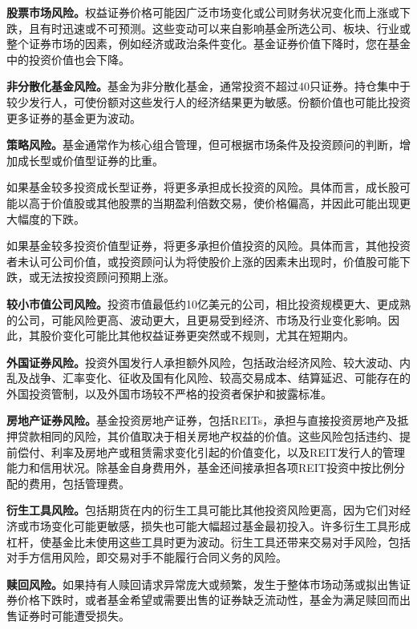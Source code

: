 \documentclass[UTF8,fontset=none,11pt,a4paper]{ctexart}
\begin{document}
\textbf{股票市场风险。}权益证券价格可能因广泛市场变化或公司财务状况变化而上涨或下跌，且有时迅速或不可预测。这些变动可以来自影响基金所选公司、板块、行业或整个证券市场的因素，例如经济或政治条件变化。基金证券价值下降时，您在基金中的投资价值\allowbreak\mbox{也会下降。}

\textbf{非分散化基金风险。}基金为非分散化基金，通常投资不超过40只证券。持仓集中于较少发行人，可使份额对这些发行人的经济结果更为敏感。份额价值也可能比投资更多证券的基金\allowbreak\mbox{更为波动。}

\textbf{策略风险。}基金通常作为核心组合管理，但可根据市场条件及投资顾问的判断，增加成长型或价值型证\allowbreak\mbox{券的比重。}

如果基金较多投资成长型证券，将更多承担成长投资的风险。具体而言，成长股可能以高于价值股或其他股票的当期盈利倍数交易，使价格偏高，并因此可能出现更大幅\allowbreak\mbox{度的下跌。}

如果基金较多投资价值型证券，将更多承担价值投资的风险。具体而言，其他投资者未认可公司价值，或投资顾问认为将使股价上涨的因素未出现时，价值股可能下跌，或无法按投资顾问\allowbreak\mbox{预期上涨。}


\par{}\label{originalpage3}
\textbf{较小市值公司风险。}投资市值最低约10亿美元的公司，相比投资规模更大、更成熟的公司，可能风险更高、波动更大，且更易受到经济、市场及行业变化影响。因此，其股价变化可能比其他权益证券更突然或不规则，尤其\allowbreak\mbox{在短期内。}

\textbf{外国证券风险。}投资外国发行人承担额外风险，包括政治经济风险、较大波动、内乱及战争、汇率变化、征收及国有化风险、较高交易成本、结算延迟、可能存在的外国投资管制，以及外国市场较不严格的投资者保护和\allowbreak\mbox{披露标准。}

\textbf{房地产证券风险。}基金投资房地产证券，包括REITs，承担与直接投资房地产及抵押贷款相同的风险，其价值取决于相关房地产权益的价值。这些风险包括违约、提前偿付、利率及房地产或租赁需求变化引起的价值变化，以及REIT发行人的管理能力和信用状况。除基金自身费用外，基金还间接承担各项REIT投资中按比例分配的费用，包\allowbreak\mbox{括管理费。}

\textbf{衍生工具风险。}包括期货在内的衍生工具可能比其他投资风险更高，因为它们对经济或市场变化可能更敏感，损失也可能大幅超过基金最初投入。许多衍生工具形成杠杆，使基金比未使用这些工具时更为波动。衍生工具还带来交易对手风险，包括对手方信用风险，即交易对手不能履行合同义\allowbreak\mbox{务的风险。}

\textbf{赎回风险。}如果持有人赎回请求异常庞大或频繁，发生于整体市场动荡或拟出售证券价格下跌时，或者基金希望或需要出售的证券缺乏流动性，基金为满足赎回而出售证券时可能\allowbreak\mbox{遭受损失。}
\end{document}
